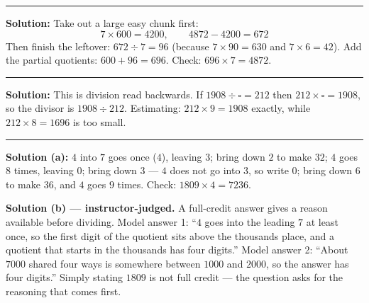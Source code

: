 \documentclass[12pt]{article}
\begin{document}
\vspace{0.12cm}\noindent\rule{\linewidth}{0.2pt}


\textbf{Solution:} Take out a large easy chunk first:
\[ 7 \times 600 = \boxed{4200}, \qquad 4872 - 4200 = \boxed{672} \]
Then finish the leftover: $672 \div 7 = \boxed{96}$ (because $7 \times 90 = 630$ and
$7 \times 6 = 42$). Add the partial quotients: $600 + 96 = 696$. Check:
$696 \times 7 = 4872$. 

\vspace{0.12cm}\noindent\rule{\linewidth}{0.2pt}


\textbf{Solution:} This is division read backwards. If $1908 \div \square = 212$ then
$212 \times \square = 1908$, so the divisor is $1908 \div 212$. Estimating: $212 \times 9 = 1908$
exactly, while $212 \times 8 = 1696$ is too small. 

\vspace{0.12cm}\noindent\rule{\linewidth}{0.2pt}


\textbf{Solution (a):} $4$ into $7$ goes once ($4$), leaving $3$; bring down $2$ to make $32$;
$4$ goes $8$ times, leaving $0$; bring down $3$ --- $4$ does not go into $3$, so write $0$; bring down
$6$ to make $36$, and $4$ goes $9$ times. Check: $1809 \times 4 = 7236$. 

\textbf{Solution (b) --- instructor-judged.} A full-credit answer gives a reason available before
dividing. Model answer 1: ``$4$ goes into the leading $7$ at least once, so the first digit of the
quotient sits above the thousands place, and a quotient that starts in the thousands has four
digits.'' Model answer 2: ``About $7000$ shared four ways is somewhere between $1000$ and $2000$, so
the answer has four digits.'' Simply stating $1809$ is not full credit --- the question asks for the
reasoning that comes first.
\end{document}
